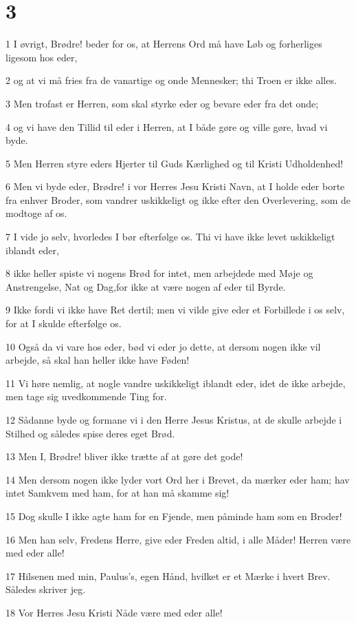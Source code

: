 \chapter{3}

\par 1 I øvrigt, Brødre! beder for os, at Herrens Ord må have Løb og forherliges ligesom hos eder,
\par 2 og at vi må fries fra de vanartige og onde Mennesker; thi Troen er ikke alles.
\par 3 Men trofast er Herren, som skal styrke eder og bevare eder fra det onde;
\par 4 og vi have den Tillid til eder i Herren, at I både gøre og ville gøre, hvad vi byde.
\par 5 Men Herren styre eders Hjerter til Guds Kærlighed og til Kristi Udholdenhed!
\par 6 Men vi byde eder, Brødre! i vor Herres Jesu Kristi Navn, at I holde eder borte fra enhver Broder, som vandrer uskikkeligt og ikke efter den Overlevering, som de modtoge af os.
\par 7 I vide jo selv, hvorledes I bør efterfølge os. Thi vi have ikke levet uskikkeligt iblandt eder,
\par 8 ikke heller spiste vi nogens Brød for intet, men arbejdede med Møje og Anstrengelse, Nat og Dag,for ikke at være nogen af eder til Byrde.
\par 9 Ikke fordi vi ikke have Ret dertil; men vi vilde give eder et Forbillede i os selv, for at I skulde efterfølge os.
\par 10 Også da vi vare hos eder, bød vi eder jo dette, at dersom nogen ikke vil arbejde, så skal han heller ikke have Føden!
\par 11 Vi høre nemlig, at nogle vandre uskikkeligt iblandt eder, idet de ikke arbejde, men tage sig uvedkommende Ting for.
\par 12 Sådanne byde og formane vi i den Herre Jesus Kristus, at de skulle arbejde i Stilhed og således spise deres eget Brød.
\par 13 Men I, Brødre! bliver ikke trætte af at gøre det gode!
\par 14 Men dersom nogen ikke lyder vort Ord her i Brevet, da mærker eder ham; hav intet Samkvem med ham, for at han må skamme sig!
\par 15 Dog skulle I ikke agte ham for en Fjende, men påminde ham som en Broder!
\par 16 Men han selv, Fredens Herre, give eder Freden altid, i alle Måder! Herren være med eder alle!
\par 17 Hilsenen med min, Paulus's, egen Hånd, hvilket er et Mærke i hvert Brev. Således skriver jeg.
\par 18 Vor Herres Jesu Kristi Nåde være med eder alle!



